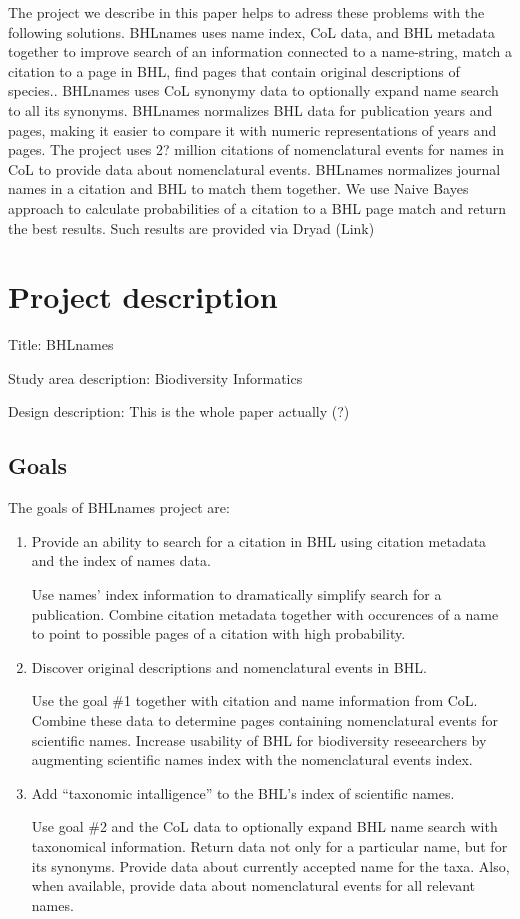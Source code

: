 \documentclass[
]{article}
\begin{document}
The project we describe in this paper helps to adress these problems
with the following solutions. BHLnames uses name index, CoL data, and
BHL metadata together to improve search of an information connected to a
name-string, match a citation to a page in BHL, find pages that contain
original descriptions of species.. BHLnames uses CoL synonymy data to
optionally expand name search to all its synonyms. BHLnames normalizes
BHL data for publication years and pages, making it easier to compare it
with numeric representations of years and pages. The project uses 2?
million citations of nomenclatural events for names in CoL to provide
data about nomenclatural events. BHLnames normalizes journal names in a
citation and BHL to match them together. We use Naive Bayes approach to
calculate probabilities of a citation to a BHL page match and return the
best results. Such results are provided via Dryad (Link)

\hypertarget{project-description}{%
\section{Project description}\label{project-description}}

Title: BHLnames

Study area description: Biodiversity Informatics

Design description: This is the whole paper actually (?)

\hypertarget{goals}{%
\subsection{Goals}\label{goals}}

The goals of BHLnames project are:

\begin{enumerate}
\def\labelenumi{\arabic{enumi}.}
\item
  Provide an ability to search for a citation in BHL using citation
  metadata and the index of names data.

  Use names' index information to dramatically simplify search for a
  publication. Combine citation metadata together with occurences of a
  name to point to possible pages of a citation with high probability.
\item
  Discover original descriptions and nomenclatural events in BHL.

  Use the goal \#1 together with citation and name information from CoL.
  Combine these data to determine pages containing nomenclatural events
  for scientific names. Increase usability of BHL for biodiversity
  reseearchers by augmenting scientific names index with the
  nomenclatural events index.
\item
  Add ``taxonomic intalligence'' to the BHL's index of scientific names.

  Use goal \#2 and the CoL data to optionally expand BHL name search
  with taxonomical information. Return data not only for a particular
  name, but for its synonyms. Provide data about currently accepted name
  for the taxa. Also, when available, provide data about nomenclatural
  events for all relevant names.
\end{enumerate}
\end{document}
